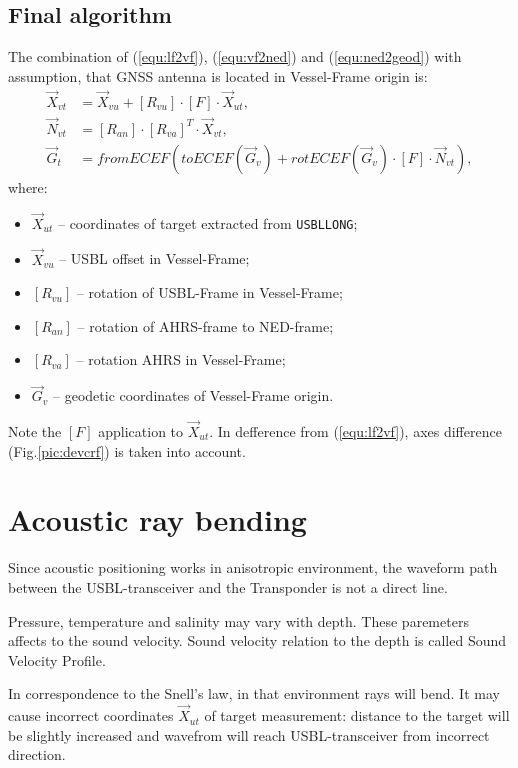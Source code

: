 \documentclass[10pt,letterpaper]{article}
\numberwithin{equation}{section}
\numberwithin{figure}{section}
\numberwithin{table}{section}
\begin{document}
\subsection{Final algorithm}

The combination of (\ref{equ:lf2vf}), (\ref{equ:vf2ned}) and (\ref{equ:ned2geod}) with assumption,
that GNSS antenna is located in Vessel-Frame origin is:
\begin{equation}
    \begin{split}
        \vec{X}_{vt} & = \vec{X}_{vu} + [R_{vu}] \cdot [F] \cdot \vec{X}_{ut}, \\
        \vec{N}_{vt} & = [R_{an}] \cdot [R_{va}]^{T} \cdot \vec{X}_{vt}, \\
        \vec{G}_{t}  & = fromECEF(toECEF(\vec{G}_{v}) + rotECEF(\vec{G}_{v}) \cdot [F] \cdot \vec{N}_{vt}),
    \end{split}
\end{equation}
where:
\begin{itemize}
    \item $\vec{X}_{ut}$ -- coordinates of target extracted from \texttt{USBLLONG};
    \item $\vec{X}_{vu}$ -- USBL offset in Vessel-Frame;
    \item $[R_{vu}]$ -- rotation of USBL-Frame in Vessel-Frame;
    \item $[R_{an}]$ -- rotation of AHRS-frame to NED-frame;
    \item $[R_{va}]$ -- rotation AHRS in Vessel-Frame;
    \item $\vec{G}_{v}$ -- geodetic coordinates of Vessel-Frame origin.
\end{itemize}

Note the $[F]$ application to $\vec{X}_{ut}$. In defference from (\ref{equ:lf2vf}),
axes difference (Fig.\ref{pic:devcrf}) is taken into account.


\section{Acoustic ray bending}

Since acoustic positioning works in anisotropic environment, the waveform path
between the USBL-transceiver and the Transponder is not a direct line.

Pressure, temperature and salinity may vary with depth. These paremeters affects
to the sound velocity. Sound velocity relation to the depth is called Sound Velocity
Profile.

In correspondence to the Snell's law, in that environment rays will bend. It may
cause incorrect coordinates $\vec{X}_{ut}$ of target measurement: distance to the
target will be slightly increased and wavefrom will reach USBL-transceiver from
incorrect direction.
\end{document}

